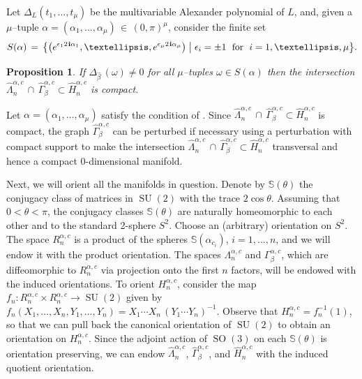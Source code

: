 \documentclass[11pt,reqno]{amsart}
\newtheorem{proposition}[theorem]{Proposition}
\theoremstyle{definition}
\renewcommand{\i}{\mspace{1.5mu}\mathbf i}
\newcommand{\SU}{\operatorname{SU}}
\newcommand{\SO}{\operatorname{SO}}
\begin{document}
\begin{sloppypar}
Let $\Delta_L(t_1,\ldots, t_{\mu})$ be the multivariable Alexander polynomial of $L$, and, given a $\mu$--tuple $\alpha = (\alpha_1,\ldots, \alpha_{\mu})\, \in\, (0, \pi)^{\mu}$, consider the finite set 
\begin{equation}\label{E:S}
S(\alpha)\, =\, \big\lbrace  \big(e^{\epsilon_1 2 \i \alpha_1}, \dots, e^{\epsilon_{\mu} 2 \i \alpha_{\mu}}\big)
\; \big| \; \epsilon_i = \pm 1\;\text{ for }\; i = 1, \dots, \mu \big\rbrace.
\end{equation}

\begin{proposition}
If $\Delta_{\widehat{\beta}}\,(\omega) \neq 0$ for all $\mu$--tuples $\omega \in S(\alpha)$ then the intersection $\widehat{\Lambda}_n^{\alpha, c}\,\cap\,\widehat{\Gamma}_{\beta}^{\alpha,c} \subset \widehat{H}_n^{\alpha, c}$ is compact.
\end{proposition}
		
Let $\alpha = (\alpha_1,\ldots, \alpha_{\mu})$ satisfy the condition of . Since $\widehat{\Lambda}_n^{\alpha,c}\,\cap\,\widehat{\Gamma}_{\beta}^{\alpha, c} \subset \widehat{H}_n^{\alpha, c}$ is compact, the graph $\widehat{\Gamma}_{\beta}^{\alpha,c}$ can be perturbed if necessary using a perturbation with compact support to make the intersection $\widehat{\Lambda}_n^{\alpha,c}\,\cap\,\widehat{\Gamma}_{\beta}^{\alpha, c} \subset \widehat{H}_n^{\alpha, c}$ transversal and hence a compact $0$-dimensional manifold.

Next, we will orient all the manifolds in question. Denote by $\mathbb{S}(\theta)$ the conjugacy class of matrices in $\SU(2)$ with the trace $2\cos \theta$. Assuming that $0 < \theta < \pi$, the conjugacy classes $\mathbb S(\theta)$ are naturally homeomorphic to each other and to the standard 2-sphere $S^2$. Choose an (arbitrary) orientation on $S^2$. The space $R_n^{\alpha, c}$ is a product of the spheres $\mathbb{S}(\alpha_{c_i})$, $i = 1,\ldots, n$, and we will endow it with the product orientation. The spaces $\Lambda_{n}^{\alpha, c}$ and $\Gamma_{\beta}^{\alpha,c}$, which are diffeomorphic to $R_n^{\alpha, c}$ via projection onto the first $n$ factors, will be endowed with the induced orientations. To orient $H_n^{\alpha, c}$, consider the map $f_n: R_n^{\alpha, c} \times R_n^{\alpha, c} \to \SU(2)$ given by $f_n(X_1, \dots, X_n, Y_1, \dots, Y_n) = X_1 \cdots X_n\, (Y_1 \cdots Y_n)^{- 1}$. Observe that $H_n^{\alpha, c} = f_n^{- 1}(1)$, so that we can pull back the canonical orientation of $\SU(2)$ to obtain an orientation on $H_n^{\alpha, c}$. Since the adjoint action of $\SO(3)$ on each $\mathbb{S}(\theta)$ is orientation preserving, we can endow $\widehat{\Lambda}_n^{\alpha, c}$, $\widehat{\Gamma}_{\beta}^{\alpha,c}$, and $\widehat{H}_n^{\alpha, c}$ with the induced quotient orientation. 
		

\end{sloppypar}
\end{document}

